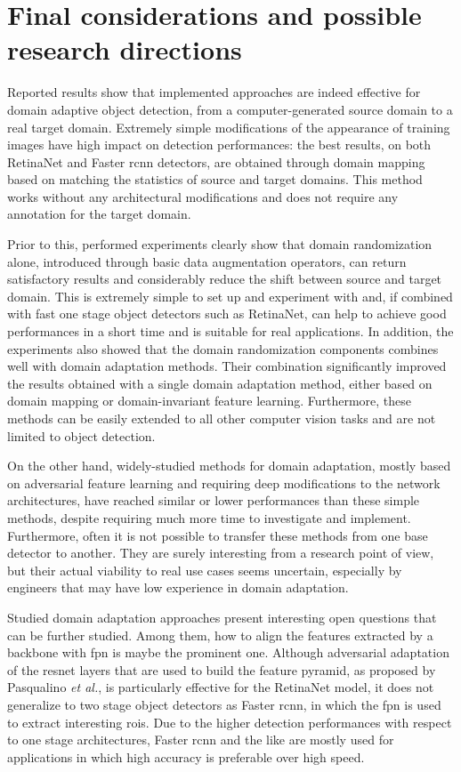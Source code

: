 \documentclass[%
    corpo=12pt,
    twoside,
    stile=classica,   
    tipotesi=magistrale,
    evenboxes,
    english,
	numerazioneromana,
]{toptesi}
\begin{document}
\section{Final considerations and possible research directions}
Reported results show that implemented approaches are indeed effective for domain adaptive object detection, from a computer-generated source domain to a real target domain. Extremely simple modifications of the appearance of training images have high impact on detection performances: the best results, on both RetinaNet and Faster \gls{rcnn} detectors, are obtained through domain mapping based on matching the statistics of source and target domains. This method works without any architectural modifications and does not require any annotation for the target domain.

Prior to this, performed experiments clearly show that domain randomization alone, introduced through basic data augmentation operators, can return satisfactory results and considerably reduce the shift between source and target domain. This is extremely simple to set up and experiment with and, if combined with fast one stage object detectors such as RetinaNet, can help to achieve good performances in a short time and is suitable for real applications. In addition, the experiments also showed that the domain randomization components combines well with domain adaptation methods. Their combination significantly improved the results obtained with a single domain adaptation method, either based on domain mapping or domain-invariant feature learning. Furthermore, these methods can be easily extended to all other computer vision tasks and are not limited to object detection.

On the other hand, widely-studied methods for domain adaptation, mostly based on adversarial feature learning and requiring deep modifications to the network architectures, have reached similar or lower performances than these simple methods, despite requiring much more time to investigate and implement. Furthermore, often it is not possible to transfer these methods from one base detector to another. They are surely interesting from a research point of view, but their actual viability to real use cases seems uncertain, especially by engineers that may have low experience in domain adaptation.

\bigskip
Studied domain adaptation approaches present interesting open questions that can be further studied. Among them, how to align the features extracted by a backbone with \gls{fpn} is maybe the prominent one. Although adversarial adaptation of the \gls{resnet} layers that are used to build the feature pyramid, as proposed by Pasqualino \textit{et al.}\cite{pasqualino2020unsupervised}, is particularly effective for the RetinaNet model, it does not generalize to two stage object detectors as Faster \gls{rcnn}, in which the \gls{fpn} is used to extract interesting \glspl{roi}. Due to the higher detection performances with respect to one stage architectures, Faster \gls{rcnn} and the like are mostly used for applications in which high accuracy is preferable over high speed.
\end{document}
